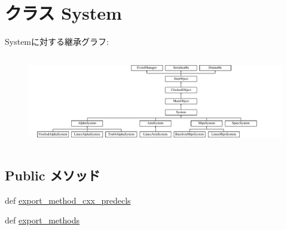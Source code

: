 \hypertarget{classSystem_1_1System}{
\section{クラス System}
\label{classSystem_1_1System}
}
Systemに対する継承グラフ:\begin{figure}[H]
\begin{center}
\leavevmode
\includegraphics[height=4cm]{classSystem_1_1System}
\end{center}
\end{figure}
\subsection*{Public メソッド}
\begin{DoxyCompactItemize}
\item 
def \hyperlink{classSystem_1_1System_a4c94af862ca1bc3ebde2094d5e778ef1}{export\_\-method\_\-cxx\_\-predecls}
\item 
def \hyperlink{classSystem_1_1System_ab373c5eaef9a7b80491a097389260f4a}{export\_\-methods}
\end{DoxyCompactItemize}
